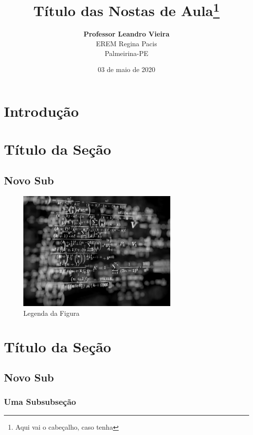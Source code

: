 \documentclass[oneside,a4paper,12pt]{article}
\title{Título das Nostas de Aula\footnote{Aqui vai o cabeçalho, caso tenha}}
\author{\textbf{Professor Leandro Vieira}\\EREM Regina Pacis\\Palmeirina-PE}
\date{03 de maio de 2020}
\begin{document}
\maketitle

\tableofcontents

\section{Introdução}

\lipsum[1-2]

\section{Título da Seção}

\lipsum[1-2]

\lipsum[1-2]

\subsection{Novo Sub}

\lipsum[1-2]


	\begin{figure}[h]
	\center
	\includegraphics[width=8cm]{Figuras/imagem.jpg}
	\caption{Legenda da Figura}
	\label{rotulodafigura}
	\end{figure}

\lipsum[1-2]


\section{Título da Seção}

\lipsum[1-2]

\subsection{Novo Sub}

\lipsum[1-2]
	
\subsubsection{Uma Subsubseção} 

\lipsum[1-2]
\end{document}
